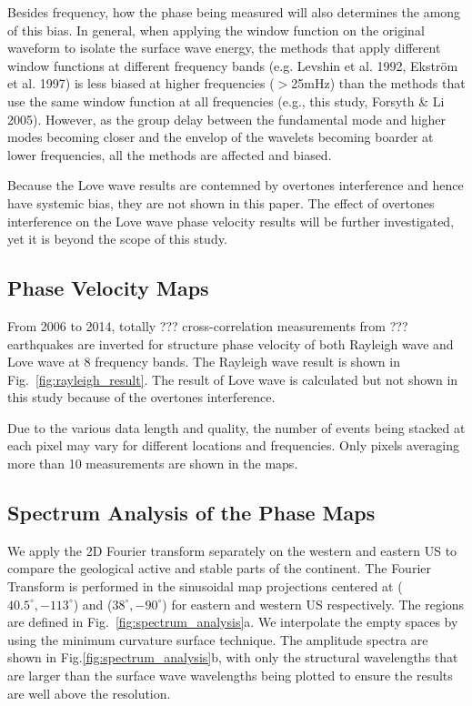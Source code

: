 \documentclass[referee]{gji}
\begin{document}
Besides frequency, how the phase being measured will also determines the among of this bias. In general, when applying the window function on the original waveform to isolate the surface wave energy, the methods that apply different window functions at different frequency bands (e.g. Levshin et al. 1992, Ekstr\"{o}m et al. 1997) is less biased at higher frequencies ($>$25mHz) than the methods that use the same window function at all frequencies (e.g., this study, Forsyth \& Li 2005). However, as the group delay between the fundamental mode and higher modes becoming closer and the envelop of the wavelets becoming boarder at lower frequencies, all the methods are affected and biased.

Because the Love wave results are contemned by overtones interference and hence have systemic bias, they are not shown in this paper. The effect of overtones interference on the Love wave phase velocity results will be further investigated, yet it is beyond the scope of this study.

\subsection{Phase Velocity Maps}

From 2006 to 2014, totally ??? cross-correlation measurements from ??? earthquakes are inverted for structure phase velocity of both Rayleigh wave and Love wave at 8 frequency bands. The Rayleigh wave result is shown in Fig.~\ref{fig:rayleigh_result}. The result of Love wave is calculated but not shown in this study because of the overtones interference. 

Due to the various data length and quality, the number of events being stacked at each pixel may vary for different locations and frequencies. Only pixels averaging more than 10 measurements are shown in the maps.

\subsection{Spectrum Analysis of the Phase Maps}

We apply the 2D Fourier transform separately on the western and eastern US to compare the geological active and stable parts of the continent. The Fourier Transform is performed in the sinusoidal map projections centered at ($40.5^\circ,-113^\circ$) and ($38^\circ,-90^\circ$) for eastern and western US respectively. The regions are defined in Fig.~\ref{fig:spectrum_analysis}a. We interpolate the empty spaces by using the minimum curvature surface technique. The amplitude spectra are shown in Fig.\ref{fig:spectrum_analysis}b, with only the structural wavelengths that are larger than the surface wave wavelengths being plotted to ensure the results are well above the resolution. 
\end{document}
